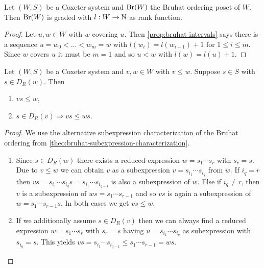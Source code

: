 \begin{coro}
	Let $(W,S)$ be a Coxeter system and $\operatorname{Br}(W)$ the Bruhat ordering poset of $W$. Then $\operatorname{Br}(W)$ is graded with $l:W \to \mathbb{N}$ as rank function.

	\begin{proof}
		Let $u,w \in W$ with $w$ covering $u$. Then \ref{prop:bruhat-intervals} says there is a sequence $u = w_0 < \ldots < w_m = w$ with $l(w_i) = l(w_{i-1}) + 1$ for $1 \leq i \leq m$. Since $w$ covers $u$ it must be $m = 1$ and so $u < w$ with $l(w) = l(u) + 1$.
	\end{proof}
\end{coro}

\begin{theo}
	Let $(W,S)$ be a Coxeter system and $v,w \in W$ with $v \leq w$. Suppose $s \in S$ with $s \in D_R(w)$. Then
	\begin{enumerate}
		\item $vs \leq w$,
		\item $s \in D_R(v) \Rightarrow vs \leq ws$.
	\end{enumerate}

	\begin{proof}
		We use the alternative subexpression characterization of the Bruhat ordering from \ref{theo:bruhat-subexpression-characterization}.
		\begin{enumerate}
			\item Since $s \in D_R(w)$ there exists a reduced expression $w = s_1 \cdots s_r$ with $s_r = s$. Due to $v \leq w$ we can obtain $v$ as a subexpression $v = s_{i_1} \cdots s_{i_q}$ from $w$. If $i_q = r$ then $vs = s_{i_1} \cdots s_{i_q} s = s_{i_1} \cdots s_{i_{q - 1}}$ is also a subexpression of $w$. Else if $i_q \neq r$, then $v$ is a subexpression of $ws = s_1 \cdots s_{r-1}$ and so $vs$ is again a subexpression of $w = s_1 \cdots s_{r-1} s$. In both cases we get $vs \leq w$.
			\item If we additionally assume $s \in D_R(v)$ then we can always find a reduced expression $w = s_1 \cdots s_r$ with $s_r = s$ having $u = s_{i_1} \cdots s_{i_q}$ as subexpression with $s_{i_q} = s$. This yields $vs = s_{i_1} \cdots s_{i_{q-1}} \leq s_1 \cdots s_{r-1} = ws$. \qedhere
		\end{enumerate}
	\end{proof}
\end{theo}

